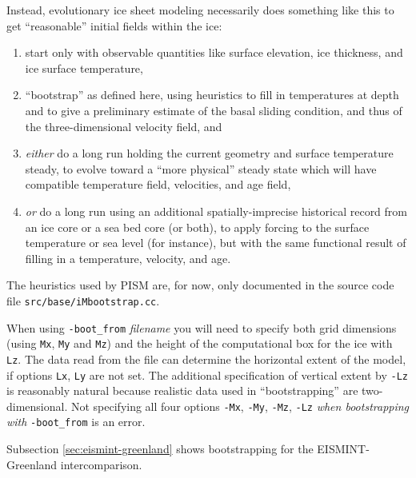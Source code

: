\documentclass[titlepage,letterpaper,final]{scrartcl}
\renewcommand{\t}[1]{\texttt{#1}}
\newcommand{\txtopt}[2]{\texttt{-#1} #2\optindex{\texttt{-#1} #2}}
\newcommand{\fileopt}[1]{\txtopt{#1}{\emph{filename}}}
\begin{document}
Instead, evolutionary ice sheet modeling necessarily does something like this to get ``reasonable'' initial fields within the ice: \begin{enumerate}
\item start only with observable quantities like surface elevation, ice thickness, and ice surface temperature,
\item ``bootstrap'' as defined here, using heuristics to fill in temperatures at depth and to give a preliminary estimate of the basal sliding condition, and thus of the three-dimensional velocity field, and
\item \emph{either} do a long run holding the current geometry and surface temperature steady,  to evolve toward a ``more physical'' steady state which will have compatible temperature field, velocities, and age field,
\item \emph{or} do a long run using an additional spatially-imprecise historical record from an ice core or a sea bed core (or both), to apply forcing to the surface temperature or sea level (for instance), but with the same functional result of filling in a temperature, velocity, and age.
\end{enumerate}

The heuristics used by PISM are, for now, only documented in the source code file \texttt{src/base/iMbootstrap.cc}.

When using \fileopt{boot_from} you will need to specify both grid dimensions (using \t{Mx}, \t{My} and \t{Mz}) and the height of the computational box for the ice with \t{Lz}.  The data read from the file can determine the horizontal extent of the model, if options \t{Lx}, \t{Ly} are not set.  The additional specification of vertical extent by \texttt{-Lz} is reasonably natural because realistic data used in ``bootstrapping'' are two-dimensional.  Not specifying all four options \texttt{-Mx}, \texttt{-My}, \texttt{-Mz}, \texttt{-Lz} \emph{when bootstrapping with} \texttt{-boot_from} is an error.

Subsection \ref{sec:eismint-greenland} shows bootstrapping for the EISMINT-Greenland intercomparison.
\end{document}
